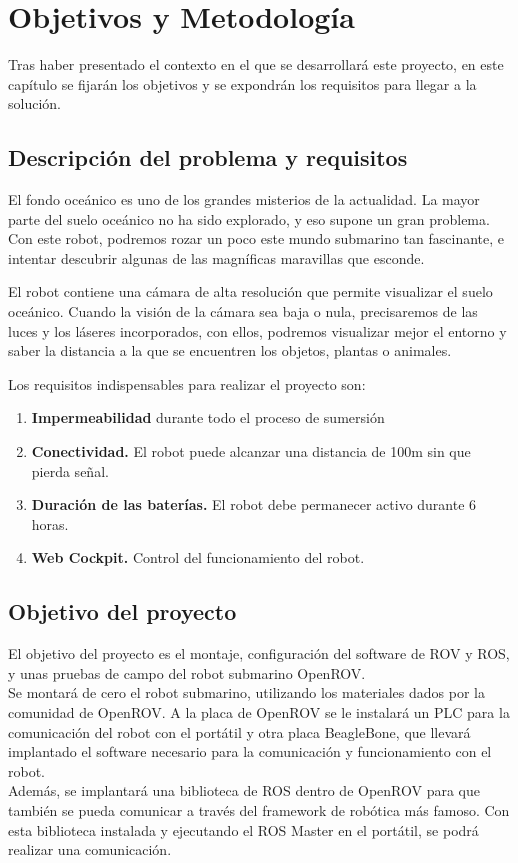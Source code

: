 \chapter{Objetivos y Metodología}
\label{cap:objetivos}
Tras haber presentado el contexto en el que se desarrollará este proyecto, en este capítulo se fijarán los objetivos y se expondrán los requisitos para llegar a la solución.
\section{Descripción del problema y requisitos}
\label{sec:descripciondelproblema}

El fondo oceánico es uno de los grandes misterios de la actualidad. La mayor parte del suelo oceánico no ha sido explorado, y eso supone un gran problema. Con este robot, podremos rozar un poco este mundo submarino tan fascinante, e intentar descubrir algunas de las magníficas maravillas que esconde.

El robot contiene una cámara de alta resolución que permite visualizar el suelo oceánico. Cuando la visión de la cámara sea baja o nula, precisaremos de las luces y los láseres incorporados, con ellos, podremos visualizar mejor el entorno y saber la distancia a la que se encuentren los objetos, plantas o animales. 

Los requisitos indispensables para realizar el proyecto son:
\begin{enumerate}
\item \textbf{Impermeabilidad} durante todo el proceso de sumersión
\item \textbf{Conectividad.} El robot puede alcanzar una distancia de 100m sin que pierda señal.
\item \textbf{Duración de las baterías.} El robot debe permanecer activo durante 6 horas. 
\item \textbf{Web Cockpit.} Control del funcionamiento del robot.
\end{enumerate}

\section{Objetivo del proyecto}
\label{sec:objetivos}

El objetivo del proyecto es el montaje, configuración del software de ROV y ROS, y unas pruebas de campo del robot submarino OpenROV. 
\\Se montará de cero el robot submarino, utilizando los materiales dados por la comunidad de OpenROV. A la placa de OpenROV se le instalará un PLC para la comunicación del robot con el portátil y otra placa BeagleBone, que llevará implantado el software necesario para la comunicación y funcionamiento con el robot.
\\Además, se implantará una biblioteca de ROS dentro de OpenROV para que también se pueda comunicar a través del framework de robótica más famoso. Con esta biblioteca instalada y ejecutando el ROS Master en el portátil, se podrá realizar una comunicación.

